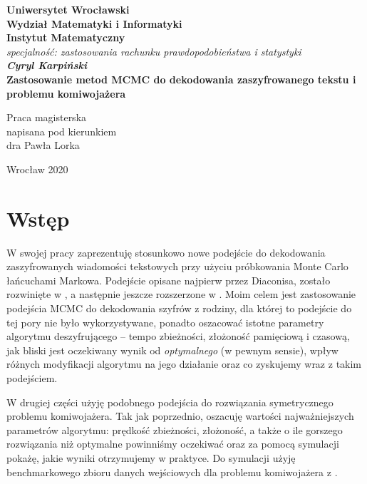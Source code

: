 \documentclass[a4paper]{article}
\begin{document}
\newpage
\thispagestyle{empty}
\begin{center}
\textbf{\large Uniwersytet Wrocławski\\
Wydział Matematyki i Informatyki\\
Instytut Matematyczny}\\
\textit{\large specjalność: zastosowania rachunku prawdopodobieństwa i statystyki}\\
\vspace{4cm}
\textbf{\textit{\large Cyryl Karpiński}\\
\vspace{0.5cm}
{\Large Zastosowanie metod MCMC do dekodowania zaszyfrowanego tekstu
i problemu komiwojażera}}\\
\end{center}
\vspace{3cm}
{\large \hspace*{6.5cm}Praca magisterska\\
\hspace*{6.5cm}napisana pod kierunkiem\\
\hspace*{6.5cm}dra Pawła Lorka}\\
\vfill
\begin{center}
{\large Wrocław 2020}\\
\end{center}

\newpage
\tableofcontents
\newpage
\section{Wstęp}
W swojej pracy zaprezentuję stosunkowo nowe podejście do dekodowania zaszyfrowanych wiadomości tekstowych przy użyciu próbkowania Monte Carlo łańcuchami Markowa. Podejście opisane najpierw przez Diaconisa, zostało rozwinięte w \cite{Connor}, a następnie jeszcze rozszerzone w \cite{Chen&Rosenthal}. Moim celem jest zastosowanie podejścia MCMC do dekodowania szyfrów z rodziny, dla której to podejście do tej pory nie było wykorzystywane, ponadto oszacować istotne parametry algorytmu deszyfrującego – tempo zbieżności, złożoność pamięciową i czasową, jak bliski jest oczekiwany wynik od \textit{optymalnego} (w pewnym sensie), wpływ różnych modyfikacji algorytmu na jego działanie oraz co zyskujemy wraz z takim podejściem.

W drugiej części użyję podobnego podejścia do rozwiązania symetrycznego problemu komiwojażera. Tak jak poprzednio, oszacuję wartości najważniejszych parametrów algorytmu: prędkość zbieżności, złożoność, a także o ile gorszego rozwiązania niż optymalne powinniśmy oczekiwać oraz za pomocą symulacji pokażę, jakie wyniki otrzymujemy w praktyce. Do symulacji użyję benchmarkowego zbioru danych wejściowych dla problemu komiwojażera z \cite{benchmark}.\\
\end{document}

